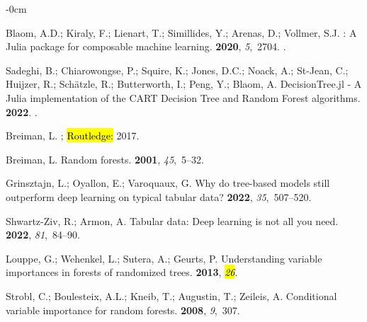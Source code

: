 \documentclass[remotesensing,article,accept,pdftex,moreauthors]{Definitions/mdpi}
\begin{document}
\begin{adjustwidth}{-\extralength}{0cm}
\begin{thebibliography}{999}
Blaom, A.D.; Kiraly, F.; Lienart, T.; Simillides, Y.; Arenas, D.; Vollmer, S.J.
: A Julia package for composable machine learning.
 {\bf 2020}, {\em 5},~2704.
.


Sadeghi, B.; Chiarowongse, P.; Squire, K.; Jones, D.C.; Noack, A.; St-Jean, C.; Huijzer, R.; Schätzle, R.; Butterworth, I.; Peng, Y.; Blaom, A.
\newblock DecisionTree.jl - A Julia implementation of the CART Decision Tree and Random Forest algorithms.
 {\bf 2022}.
.


Breiman, L.
; \hl{Routledge:} %
  2017.

Breiman, L.
\newblock Random forests.
 {\bf 2001}, {\em 45},~5--32.

Grinsztajn, L.; Oyallon, E.; Varoquaux, G.
\newblock Why do tree-based models still outperform deep learning on typical
  tabular data?
 {\bf 2022},
  {\em 35},~507--520.

Shwartz-Ziv, R.; Armon, A.
\newblock Tabular data: Deep learning is not all you need.
 {\bf 2022}, {\em 81},~84--90.

Louppe, G.; Wehenkel, L.; Sutera, A.; Geurts, P.
\newblock Understanding variable importances in forests of randomized trees.
 {\bf 2013},
  {\em \hl{26}}.


Strobl, C.; Boulesteix, A.L.; Kneib, T.; Augustin, T.; Zeileis, A.
\newblock Conditional variable importance for random forests.
 {\bf 2008}, {\em 9},~307.


\end{thebibliography}
\end{adjustwidth}
\end{document}
